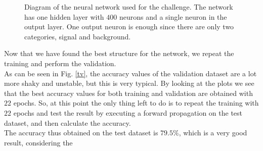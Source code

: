 \documentclass[12pt]{article}
\begin{document}
\begin{figure}
  \centering
  \caption{Diagram of the neural network used for the challenge. The network has one hidden layer with 
  $400$ neurons and a single neuron in the output layer. One output neuron is enough since there are 
  only two categories, signal and background.}
\end{figure}
\noindent Now that we have found the best structure for the network, we repeat the training and perform 
the validation. \\
As can be seen in Fig. \ref{tv}, the accuracy values of the validation dataset are a lot more shaky and 
unstable, but this is very typical. By looking at the plots we see that the best accuracy values for both
training and validation are obtained with $22$ epochs. So, at this point the only thing left to do is to
repeat the training with $22$ epochs and test the result by executing a forward propagation on the test
dataset, and then calculate the accuracy. \\
The accuracy thus obtained on the test dataset is $79.5 \%$, which is a very good result, considering the 
\end{document}
